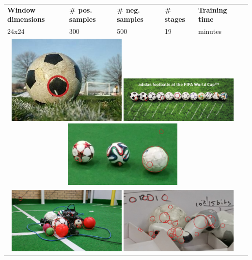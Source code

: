 \begin{tabularx}{\textwidth}{llllll}
    \label{table:interim-results}
    \textbf{Window dimensions} & \textbf{\# pos. samples} & \textbf{\# neg. samples} & \textbf{\# stages} & \textbf{Training time} \\
    24x24 & 300 & 500 & 19 & \mytilda7 minutes \\
    \multicolumn{5}{c}{
        \includegraphics[width=6.0cm]{results/1/sphere_3}
        \includegraphics[width=6.0cm]{results/1/sphere_4}
        \includegraphics[width=6.0cm]{results/1/sphere_5}
    } \\
    \multicolumn{5}{c}{
        \includegraphics[width=6.0cm]{results/1/sphere_6}
        \includegraphics[width=6.0cm]{results/1/sphere_7}
}
\end{tabularx}
